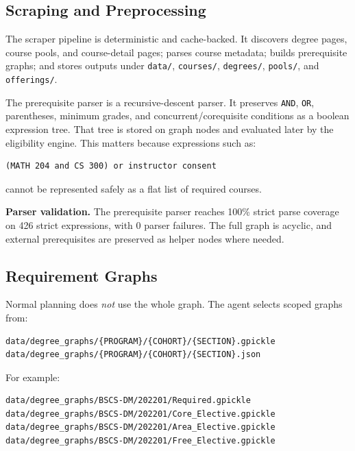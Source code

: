 \documentclass[10pt,letterpaper]{article}
\newcommand{\code}[1]{\texttt{#1}}
\begin{document}
\subsection{Scraping and Preprocessing}
The scraper pipeline is deterministic and cache-backed. It discovers degree pages, course pools, and course-detail pages; parses course metadata; builds prerequisite graphs; and stores outputs under \code{data/}, \code{courses/}, \code{degrees/}, \code{pools/}, and \code{offerings/}.

The prerequisite parser is a recursive-descent parser. It preserves \code{AND}, \code{OR}, parentheses, minimum grades, and concurrent/corequisite conditions as a boolean expression tree. That tree is stored on graph nodes and evaluated later by the eligibility engine. This matters because expressions such as:

\begin{lstlisting}
(MATH 204 and CS 300) or instructor consent
\end{lstlisting}

cannot be represented safely as a flat list of required courses.

\begin{findingbox}
\textbf{Parser validation.} The prerequisite parser reaches 100\% strict parse coverage on 426 strict expressions, with 0 parser failures. The full graph is acyclic, and external prerequisites are preserved as helper nodes where needed.
\end{findingbox}

\subsection{Requirement Graphs}
Normal planning does \emph{not} use the whole graph. The agent selects scoped graphs from:

\begin{lstlisting}
data/degree_graphs/{PROGRAM}/{COHORT}/{SECTION}.gpickle
data/degree_graphs/{PROGRAM}/{COHORT}/{SECTION}.json
\end{lstlisting}

For example:

\begin{lstlisting}
data/degree_graphs/BSCS-DM/202201/Required.gpickle
data/degree_graphs/BSCS-DM/202201/Core_Elective.gpickle
data/degree_graphs/BSCS-DM/202201/Area_Elective.gpickle
data/degree_graphs/BSCS-DM/202201/Free_Elective.gpickle
\end{lstlisting}
\end{document}
